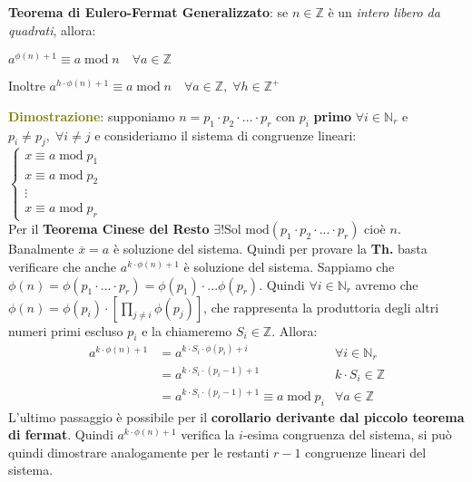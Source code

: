 \newpage
\begin{flushleft}
    \textbf{Teorema di Eulero-Fermat Generalizzato}: se $n \in \mathbb{Z}$ è un \textit{intero libero da quadrati}, allora:

    {\centering
        $a^{\phi(n) + 1} \equiv a \; \text{mod} \; n \quad \forall a \in \mathbb{Z}$
    \par}
    Inoltre $a^{h \cdot \phi(n) + 1} \equiv a \; \text{mod} \; n \quad \forall a \in \mathbb{Z}, \; \forall h \in \mathbb{Z}^+$

    \begin{boxA}
        \textcolor{olive}{\textbf{Dimostrazione}}: supponiamo $n = p_1 \cdot p_2 \cdot ... \cdot p_r$ con $p_i$ \textbf{primo} $\forall i \in \mathbb{N}_r$ e $p_i \neq p_j, \; \forall i \neq j$ e consideriamo il sistema di congruenze lineari: \\
        $\begin{cases}
            x \equiv a \; \text{mod} \; p_1 \\
            x \equiv a \; \text{mod} \; p_2 \\
            \vdots \\
            x \equiv a \; \text{mod} \; p_r
        \end{cases}$ \\
        Per il \textbf{Teorema Cinese del Resto} $\exists ! \text{Sol mod}(p_1 \cdot p_2 \cdot ... \cdot p_r)$ cioè $n$. Banalmente $\overline{x} = a$ è soluzione del sistema. Quindi per provare la \textbf{Th.} basta verificare che anche $a^{k \cdot \phi(n) + 1}$ è soluzione del sistema. Sappiamo che $\phi(n) = \phi(p_1 \cdot ... \cdot p_r) = \phi(p_1) \cdot ... \phi(p_r)$. Quindi $\forall i \in \mathbb{N}_r$ avremo che $\phi(n) = \phi(p_i) \cdot [\underset{j \neq i}{\prod}\phi(p_j)]$, che rappresenta la produttoria degli altri numeri primi escluso $p_i$ e la chiameremo $S_i \in \mathbb{Z}$. Allora:
        \begin{align*}
            a^{k \cdot \phi(n) + 1} &= a^{k \cdot S_i \cdot \phi(p_i) + i} & \forall i \in \mathbb{N}_r \\
            &= a^{k \cdot S_i \cdot (p_i - 1) + 1} & k \cdot S_i \in \mathbb{Z} \\
            &= a^{k \cdot S_i \cdot (p_i - 1) + 1} \equiv a \; \text{mod} \; p_i & \forall a \in \mathbb{Z}
        \end{align*}
        L'ultimo passaggio è possibile per il \textbf{corollario derivante dal piccolo teorema di fermat}. Quindi $a^{k \cdot \phi(n) + 1}$ verifica la $i$-esima congruenza del sistema, si può quindi dimostrare analogamente per le restanti $r - 1$ congruenze lineari del sistema.
    \end{boxA}
\end{flushleft}